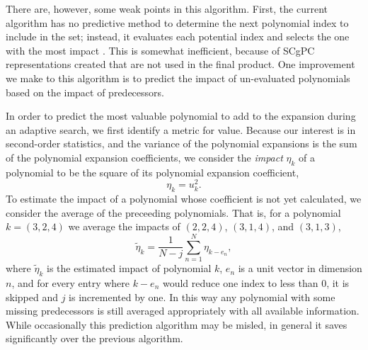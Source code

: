 There are, however, some weak points in this algorithm.  First, the current algorithm has no predictive method
to determine the next polynomial index to include in the set; instead, it evaluates each potential index and
selects the one with the most impact \cite{Ayres}.  This is somewhat inefficient, because of SCgPC representations created
that are not used in the final product.  One improvement we make to this algorithm is to predict the impact of
un-evaluated polynomials based on the impact of predecessors.

In order to predict the most valuable polynomial to add to the expansion during an adaptive search, we first
identify a metric for value.  Because our interest is in second-order statistics, and the variance of the
polynomial expansions is the sum of the polynomial expansion coefficients, we consider the \emph{impact}
$\eta_k$ of a polynomial to be the square of its polynomial expansion coefficient,
\begin{equation}\label{eq: act poly impact}
  \eta_k = u_k^2.
\end{equation}
To estimate the impact of a polynomial whose coefficient is not yet calculated, we consider the average of the
preceeding polynomials.  That is, for a polynomial $k=(3,2,4)$ we average the impacts of $(2,2,4)$, $(3,1,4)$,
and $(3,1,3)$,
\begin{equation}\label{eq: poly impact}
  \tilde \eta_k = \frac{1}{N-j}\sum_{n=1}^N \eta_{k-e_n},
\end{equation}
where $\tilde \eta_k$ is the estimated impact of polynomial $k$, $e_n$ is a unit vector in dimension $n$, and
for every entry where $k-e_n$ would reduce one index to less than 0, it is skipped and $j$ is incremented by
one.  In this way any polynomial with some missing predecessors is still averaged appropriately with all
available information.  While occasionally this prediction algorithm may be misled, in general it saves
significantly over the previous algorithm.


